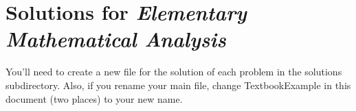\documentclass[9pt,twoside]{book}
\begin{document}
 \frontmatter

 \chapter*{Solutions for \emph{Elementary Mathematical Analysis}}

 You'll need to create a new file for the solution of each problem in the
 solutions subdirectory.  Also, if you rename your main file,
 change TextbookExample in this document (two places) to your new name.

 \cleardoublepage

 \setcounter{tocdepth}{1}
 \tableofcontents

 \mainmatter
 \pagestyle{fancy}

\setcounter{chapter}{-1}

\renewcommand{\theenumi}{\alph{enumi}}

\end{document}
